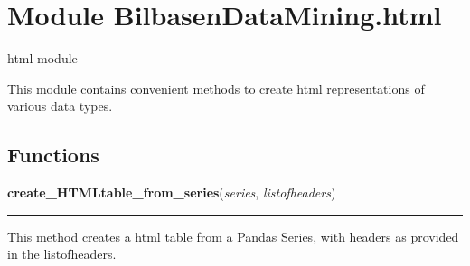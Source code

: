 %
%
%


\section{Module BilbasenDataMining.html}

    \label{BilbasenDataMining:html}
html module

This module contains convenient methods to create html representations of 
various data types.



  \subsection{Functions}

    \label{BilbasenDataMining:html:create_HTMLtable_from_series}

    \vspace{0.5ex}

\hspace{.8\funcindent}\begin{boxedminipage}{\funcwidth}

    \raggedright \textbf{create\_HTMLtable\_from\_series}(\textit{series}, \textit{listofheaders})

    \vspace{-1.5ex}

    \rule{\textwidth}{0.5\fboxrule}
\setlength{\parskip}{2ex}
    This method creates a html table from a Pandas Series, with headers as 
    provided in the listofheaders.

\setlength{\parskip}{1ex}
    \end{boxedminipage}

